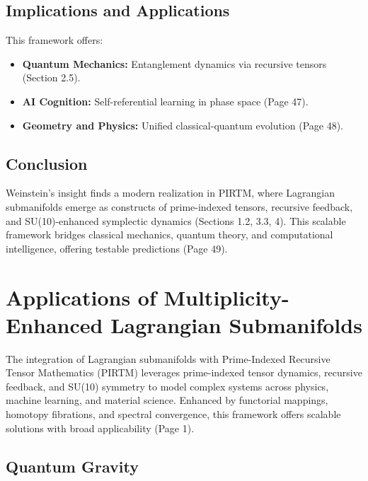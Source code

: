 \documentclass{article}
\theoremstyle{plain}
\begin{document}
\subsection{Implications and Applications}
This framework offers:
\begin{itemize}
    \item \textbf{Quantum Mechanics:} Entanglement dynamics via recursive tensors (Section 2.5).
    \item \textbf{AI Cognition:} Self-referential learning in phase space (Page 47).
    \item \textbf{Geometry and Physics:} Unified classical-quantum evolution (Page 48).
\end{itemize}

\subsection{Conclusion}
Weinstein’s insight finds a modern realization in PIRTM, where Lagrangian submanifolds emerge as constructs of prime-indexed tensors, recursive feedback, and SU(10)-enhanced symplectic dynamics (Sections 1.2, 3.3, 4). This scalable framework bridges classical mechanics, quantum theory, and computational intelligence, offering testable predictions (Page 49).


\section{Applications of Multiplicity-Enhanced Lagrangian Submanifolds}

The integration of Lagrangian submanifolds with Prime-Indexed Recursive Tensor Mathematics (PIRTM) leverages prime-indexed tensor dynamics, recursive feedback, and SU(10) symmetry to model complex systems across physics, machine learning, and material science. Enhanced by functorial mappings, homotopy fibrations, and spectral convergence, this framework offers scalable solutions with broad applicability (Page 1).

\subsection{Quantum Gravity}
\end{document}
